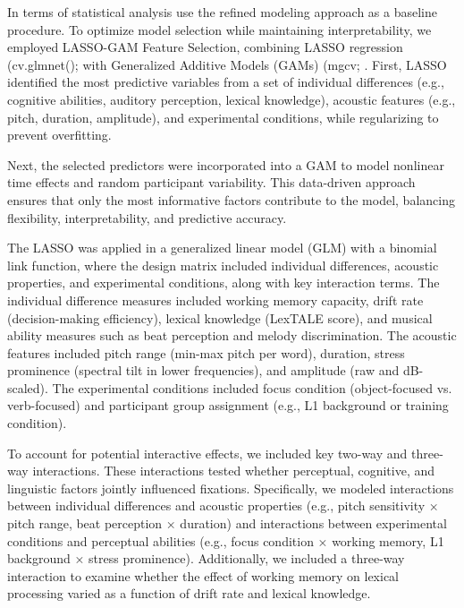 In terms of statistical analysis use the refined modeling approach as a baseline procedure. To optimize model selection while maintaining interpretability, we employed LASSO-GAM Feature Selection, combining LASSO regression (cv.glmnet(); \citep{Friedman2010} with Generalized Additive Models (GAMs) (mgcv; \citep{Wood2017}. First, LASSO identified the most predictive variables from a set of individual differences (e.g., cognitive abilities, auditory perception, lexical knowledge), acoustic features (e.g., pitch, duration, amplitude), and experimental conditions, while regularizing to prevent overfitting.

Next, the selected predictors were incorporated into a GAM to model nonlinear time effects and random participant variability. This data-driven approach ensures that only the most informative factors contribute to the model, balancing flexibility, interpretability, and predictive accuracy.

The LASSO was applied in a generalized linear model (GLM) with a binomial link function, where the design matrix included individual differences, acoustic properties, and experimental conditions, along with key interaction terms. The individual difference measures included working memory capacity, drift rate (decision-making efficiency), lexical knowledge (LexTALE score), and musical ability measures such as beat perception and melody discrimination. The acoustic features included pitch range (min-max pitch per word), duration, stress prominence (spectral tilt in lower frequencies), and amplitude (raw and dB-scaled). The experimental conditions included focus condition (object-focused vs. verb-focused) and participant group assignment (e.g., L1 background or training condition).

To account for potential interactive effects, we included key two-way and three-way interactions. These interactions tested whether perceptual, cognitive, and linguistic factors jointly influenced fixations. Specifically, we modeled interactions between individual differences and acoustic properties (e.g., pitch sensitivity × pitch range, beat perception × duration) and interactions between experimental conditions and perceptual abilities (e.g., focus condition × working memory, L1 background × stress prominence). Additionally, we included a three-way interaction to examine whether the effect of working memory on lexical processing varied as a function of drift rate and lexical knowledge.

